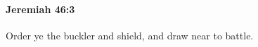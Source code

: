 
		\paragraph{Jeremiah 46:3} %
			\label{JEREMIAH-46-3}

			Order ye the buckler and shield, and draw near to battle.


